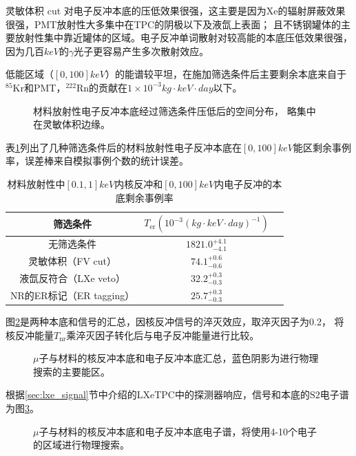 灵敏体积 cut 对电子反冲本底的压低效果很强，这主要是因为$\mathrm{Xe}$的辐射屏蔽效果很强，PMT放射性大多集中在TPC的阴极以下及液氙上表面；
且不锈钢罐体的主要放射性集中靠近罐体的区域。电子反冲单词散射对较高能的本底压低效果很强，因为几百$\si{keV}$的$\gamma$光子更容易产生多次散射效应。

低能区域（$[0, 100]\si{keV}$）的能谱较平坦，在施加筛选条件后主要剩余本底来自于${}^{85}\mathrm{Kr}$和PMT，${}^{222}\mathrm{Rn}$的贡献在$1\times10^{-3}\si{kg}\cdot\si{keV}\cdot\si{day}$以下。

\begin{figure}
  \centering
  
  \caption{\label{fig:material_er_xyzr} 材料放射性电子反冲本底经过筛选条件压低后的空间分布，
  略集中在灵敏体积边缘。}
\end{figure}

表\ref{tab:cuts_material_remain}列出了几种筛选条件后的材料放射性电子反冲本底在$[0,100]\si{keV}$能区剩余事例率，误差棒来自模拟事例个数的统计误差。

\begin{table}
  \centering
  \caption{材料放射性中$[0.1,1]\si{keV}$内核反冲和$[0,100]\si{keV}$内电子反冲的本底剩余事例率}
  \begin{tabular}{ccc}
    \toprule
    筛选条件 & $T_\mathrm{er}\left(10^{-3}\left(\si{kg}\cdot\si{keV}\cdot\si{day}\right)^{-1}\right)$ \\
    \midrule
    无筛选条件 & $1821.0_{-4.1}^{+4.1}$ \\
    灵敏体积（FV cut） & $74.1_{-0.6}^{+0.6}$ \\
    液氙反符合（LXe veto） & $32.2_{-0.3}^{+0.3}$ \\
    NR的ER标记（ER tagging） & $25.7_{-0.3}^{+0.3}$ \\
    \bottomrule
  \end{tabular}
  \label{tab:cuts_material_remain}
\end{table}

图\ref{fig:all_event_rate}是两种本底和信号的汇总，因核反冲信号的淬灭效应，取淬灭因子为0.2，
将核反冲能量$T_\mathrm{nr}$乘淬灭因子转化后与电子反冲能量进行比较。

\begin{figure}
  \centering
  
  \caption{\label{fig:all_event_rate} $\mu$子与材料的核反冲本底和电子反冲本底汇总，蓝色阴影为进行物理搜索的主要能区。}
\end{figure}

根据\ref{sec:lxe_signal}节中介绍的LXeTPC中的探测器响应，信号和本底的$\mathrm{S2}$电子谱为图\ref{fig:S2e_rate_bkg}。

\begin{figure}
  \centering
  
  \caption{\label{fig:S2e_rate_bkg} $\mu$子与材料的核反冲本底和电子反冲本底电子谱，将使用4-10个电子的区域进行物理搜索。}
\end{figure}
